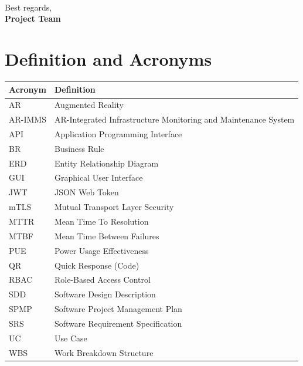 \documentclass[a4paper,11pt]{book}
\begin{document}
\mbox{}\\
\noindent Best regards,\\
\noindent \textbf{Project Team}

\chapter*{Definition and Acronyms}
\begin{table}[H]
    \centering
    \begin{tabular}{|l|p{11cm}|}
        \hline
        \textbf{Acronym} & \textbf{Definition} \\ \hline
        AR & Augmented Reality \\ \hline
        AR-IMMS & AR-Integrated Infrastructure Monitoring and Maintenance System \\ \hline
        API & Application Programming Interface \\ \hline
        BR & Business Rule \\ \hline
        ERD & Entity Relationship Diagram \\ \hline
        GUI & Graphical User Interface \\ \hline
        JWT & JSON Web Token \\ \hline
        mTLS & Mutual Transport Layer Security \\ \hline
        MTTR & Mean Time To Resolution \\ \hline
        MTBF & Mean Time Between Failures \\ \hline
        PUE & Power Usage Effectiveness \\ \hline
        QR & Quick Response (Code) \\ \hline
        RBAC & Role-Based Access Control \\ \hline
        SDD & Software Design Description \\ \hline
        SPMP & Software Project Management Plan \\ \hline
        SRS & Software Requirement Specification \\ \hline
        UC & Use Case \\ \hline
        WBS & Work Breakdown Structure \\ \hline
    \end{tabular}
\end{table}

\mainmatter







\end{document}
